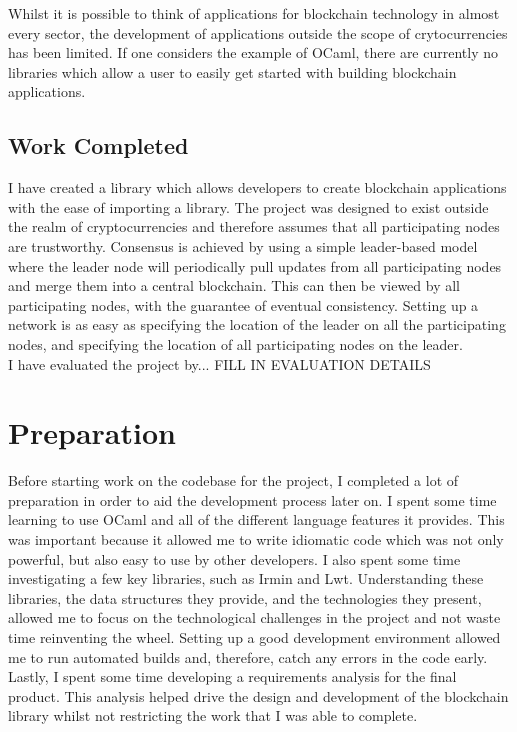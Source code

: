 \documentclass[12pt,a4paper,twoside,openright]{report}
\begin{document}
	Whilst it is possible to think of applications for blockchain technology in almost every sector, the development of applications outside the scope of crytocurrencies has been limited. 
	If one considers the example of OCaml, there are currently no libraries which allow a user to easily get started with building blockchain applications. \\

	\section{Work Completed}
	I have created a library which allows developers to create blockchain applications with the ease of importing a library.
	The project was designed to exist outside the realm of cryptocurrencies and therefore assumes that all participating nodes are trustworthy.
	Consensus is achieved by using a simple leader-based model where the leader node will periodically pull updates from all participating nodes and merge them into a central blockchain.
	This can then be viewed by all participating nodes, with the guarantee of eventual consistency.
	Setting up a network is as easy as specifying the location of the leader on all the participating nodes, and specifying the location of all participating nodes on the leader.\\
	
	I have evaluated the project by... FILL IN EVALUATION DETAILS

	\chapter{Preparation}
	Before starting work on the codebase for the project, I completed a lot of preparation in order to aid the development process later on.
	I spent some time learning to use OCaml and all of the different language features it provides.
	This was important because it allowed me to write idiomatic code which was not only powerful, but also easy to use by other developers.
	I also spent some time investigating a few key libraries, such as Irmin and Lwt.
	Understanding these libraries, the data structures they provide, and the technologies they present, allowed me to focus on the technological challenges in the project and not waste time reinventing the wheel. 
	Setting up a good development environment allowed me to run automated builds and, therefore, catch any errors in the code early.
	Lastly, I spent some time developing a requirements analysis for the final product. 
	This analysis helped drive the design and development of the blockchain library whilst not restricting the work that I was able to complete.
\end{document}
